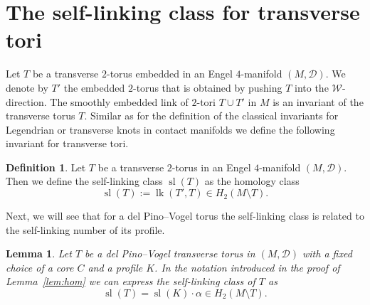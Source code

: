 \documentclass{amsart} %
\DeclareMathOperator{\lk}{lk}
\DeclareMathOperator{\slf}{sl}
\newcommand{\Z}{\mathbb{Z}}
\newcommand{\D}{\mathcal{D}}
\newcommand{\W}{\mathcal{W}}
\theoremstyle{thm}
\newtheorem{lem}[Theorem]{Lemma}
\theoremstyle{definition}
\newtheorem{defi}[Theorem]{Definition}
\begin{document}






\section{The self-linking class for transverse tori}
\label{section:selfLinkingClass} 

Let $T$ be a transverse $2$-torus embedded in an Engel $4$-manifold $(M,\D)$. We denote by $T'$ the embedded $2$-torus that is obtained by pushing $T$ into the $\W$-direction. 
The smoothly embedded link of $2$-tori $T\cup T'$ in $M$ is an invariant of the transverse torus $T$. Similar as for the definition of the classical invariants for Legendrian or transverse knots in contact manifolds we define the following invariant for transverse tori.

\begin{defi}
Let $T$ be a transverse $2$-torus in an Engel $4$-manifold $(M,\D)$. Then we define the self-linking class $\slf(T)$ as the homology class
$$\slf(T):=\lk(T',T)\in H_2(M\setminus T).$$
\end{defi}


Next, we will see that for a del Pino--Vogel torus the self-linking class is related to the self-linking number of its profile.

\begin{lem}\label{lem:computationofsl}
Let $T$ be a del Pino--Vogel transverse torus in $(M,\D)$ with a fixed choice of a core $C$ and a profile $K$. 
In the notation introduced in the proof of Lemma~\ref{lem:hom} we can express the self-linking class of $T$ as 
\begin{equation*}
\slf(T)=\slf(K)\cdot\alpha\in H_2(M\setminus T).
\end{equation*}
\end{lem}
\end{document}
